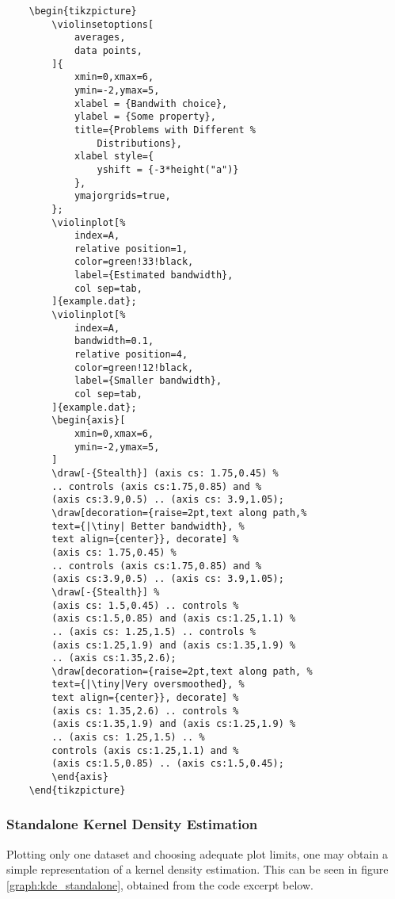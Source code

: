 \documentclass{article}
\begin{document}
\begin{verbatim}
	\begin{tikzpicture}
		\violinsetoptions[
			averages,
			data points,
		]{
			xmin=0,xmax=6,
			ymin=-2,ymax=5,
			xlabel = {Bandwith choice},
			ylabel = {Some property},
			title={Problems with Different %
				Distributions},
			xlabel style={
				yshift = {-3*height("a")}
			},
			ymajorgrids=true,
		};
		\violinplot[%
			index=A,
			relative position=1,
			color=green!33!black,
			label={Estimated bandwidth},
			col sep=tab,
		]{example.dat};
		\violinplot[%
			index=A,
			bandwidth=0.1,
			relative position=4,
			color=green!12!black,
			label={Smaller bandwidth},
			col sep=tab,
		]{example.dat};
		\begin{axis}[
			xmin=0,xmax=6,
			ymin=-2,ymax=5,
		]
		\draw[-{Stealth}] (axis cs: 1.75,0.45) %
		.. controls (axis cs:1.75,0.85) and %
		(axis cs:3.9,0.5) .. (axis cs: 3.9,1.05);
		\draw[decoration={raise=2pt,text along path,%
		text={|\tiny| Better bandwidth}, %
		text align={center}}, decorate] %
		(axis cs: 1.75,0.45) %
		.. controls (axis cs:1.75,0.85) and %
		(axis cs:3.9,0.5) .. (axis cs: 3.9,1.05);
		\draw[-{Stealth}] %
		(axis cs: 1.5,0.45) .. controls %
		(axis cs:1.5,0.85) and (axis cs:1.25,1.1) %
		.. (axis cs: 1.25,1.5) .. controls %
		(axis cs:1.25,1.9) and (axis cs:1.35,1.9) %
		.. (axis cs:1.35,2.6);
		\draw[decoration={raise=2pt,text along path, %
		text={|\tiny|Very oversmoothed}, %
		text align={center}}, decorate] %
		(axis cs: 1.35,2.6) .. controls %
		(axis cs:1.35,1.9) and (axis cs:1.25,1.9) %
		.. (axis cs: 1.25,1.5) .. %
		controls (axis cs:1.25,1.1) and %
		(axis cs:1.5,0.85) .. (axis cs:1.5,0.45);
		\end{axis}
	\end{tikzpicture}
\end{verbatim}

\subsubsection{Standalone Kernel Density Estimation}

Plotting only one dataset and choosing adequate plot limits, one
may obtain a simple representation of a kernel density estimation.
This can be seen in figure \ref{graph:kde_standalone}, obtained from the
code excerpt below.
\end{document}
